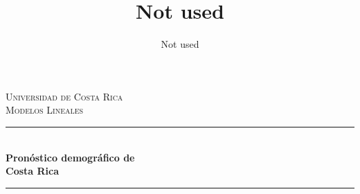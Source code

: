 \documentclass[
  letterpaper,
  onepage,
  openany]{report}
\title{Not used}
\author{Not used}
\date{}
\begin{document}
  \begin{titlepage}


  	\newcommand{\HRule}{\rule{\linewidth}{0.5mm}} %
  	
  	\center %
  	
  	
  	\textsc{\LARGE Universidad de Costa Rica}\\[1.5cm] %
  	
  	\textsc{\Large Modelos Lineales}\\[0.5cm] %
  	
  	
  	
  	\HRule\\[0.4cm]
  	
  	{\huge\bfseries Pronóstico demográfico de\\ Costa Rica}\\[0.4cm] %
  	
  	\HRule\\[1.5cm]
  	
  	
  	

\end{titlepage}
\end{document}
